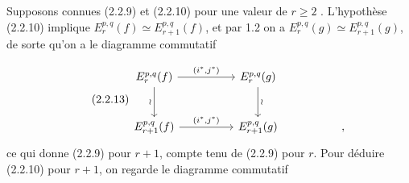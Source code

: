 
Supposons connues (2.2.9) et (2.2.10) pour une valeur de $r \geq 2$ . L'hypothèse (2.2.10) implique $E_r^{p,q}(f) \simeq E_{r+1}^{p,q}(f)$, et par 1.2 on a $E_r^{p,q}(g) \simeq E_{r+1}^{p,q}(g)$, de sorte qu'on a le diagramme commutatif

\begin{equation}\tag{2.2.13}
\begin{tikzcd}[column sep=huge, row sep=large]
E_r^{p,q}(f) \arrow[r, "{(i^*,j^*)}"] \arrow[d, "\wr"'] & E_r^{p,q}(g) \arrow[d, "\wr"] \\
E_{r+1}^{p,q}(f) \arrow[r, "{(i^*,j^*)}"] & E_{r+1}^{p,q}(g) & ,
\end{tikzcd}
\end{equation}
ce qui donne (2.2.9) pour $r+1$, compte tenu de (2.2.9) pour $r$. Pour déduire (2.2.10) pour $r+1$, on regarde le diagramme commutatif

